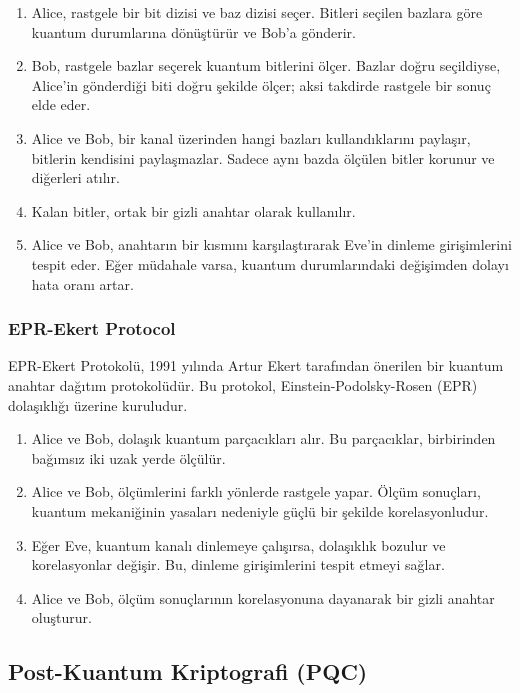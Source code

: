 \begin{enumerate}
    \item Alice, rastgele bir bit dizisi ve baz dizisi seçer. Bitleri seçilen bazlara göre kuantum durumlarına dönüştürür ve Bob'a gönderir.
    \item Bob, rastgele bazlar seçerek kuantum bitlerini ölçer. Bazlar doğru seçildiyse, Alice'in gönderdiği biti doğru şekilde ölçer; aksi takdirde rastgele bir sonuç elde eder.
    \item Alice ve Bob, bir kanal üzerinden hangi bazları kullandıklarını paylaşır, bitlerin kendisini paylaşmazlar. Sadece aynı bazda ölçülen bitler korunur ve diğerleri atılır.
    \item Kalan bitler, ortak bir gizli anahtar olarak kullanılır.
    \item Alice ve Bob, anahtarın bir kısmını karşılaştırarak Eve'in dinleme girişimlerini tespit eder. Eğer müdahale varsa, kuantum durumlarındaki değişimden dolayı hata oranı artar.
\end{enumerate}

\subsubsection{EPR-Ekert Protocol}

EPR-Ekert Protokolü, 1991 yılında Artur Ekert tarafından önerilen bir kuantum anahtar dağıtım protokolüdür. Bu protokol, Einstein-Podolsky-Rosen (EPR) dolaşıklığı üzerine kuruludur. 

\begin{enumerate}
    \item Alice ve Bob, dolaşık kuantum parçacıkları alır. Bu parçacıklar, birbirinden bağımsız iki uzak yerde ölçülür.
    \item Alice ve Bob, ölçümlerini farklı yönlerde rastgele yapar. Ölçüm sonuçları, kuantum mekaniğinin yasaları nedeniyle güçlü bir şekilde korelasyonludur.
    \item Eğer Eve, kuantum kanalı dinlemeye çalışırsa, dolaşıklık bozulur ve korelasyonlar değişir. Bu, dinleme girişimlerini tespit etmeyi sağlar.
    \item Alice ve Bob, ölçüm sonuçlarının korelasyonuna dayanarak bir gizli anahtar oluşturur.
\end{enumerate}

\newpage

\subsection{Post-Kuantum Kriptografi (PQC)}

